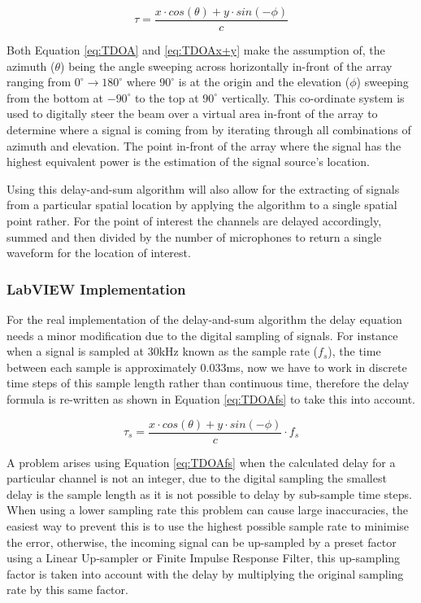 \documentclass{UoNMCHA}
\numberwithin{equation}{section}
\begin{document}
    \begin{equation}
        \tau = \frac{x \cdot cos(\theta) + y \cdot sin(-\phi)}{c}
        \label{eq:TDOAx+y}
    \end{equation}
    
    Both Equation \ref{eq:TDOA} and \ref{eq:TDOAx+y} make the assumption of, the azimuth ($\theta$) being the angle sweeping across horizontally in-front of the array ranging from $0^{\circ} \to 180^{\circ}$ where $90^{\circ}$ is at the origin and the elevation ($\phi$) sweeping from the bottom at $-90^{\circ}$ to the top at $90^{\circ}$ vertically. This co-ordinate system is used to digitally steer the beam over a virtual area in-front of the array to determine where a signal is coming from by iterating through all combinations of azimuth and elevation. The point in-front of the array where the signal has the highest equivalent power is the estimation of the signal source's location.
    
    Using this delay-and-sum algorithm will also allow for the extracting of signals from a particular spatial location by applying the algorithm to a single spatial point rather. For the point of interest the channels are delayed accordingly, summed and then divided by the number of microphones to return a single waveform for the location of interest.
\subsubsection{LabVIEW Implementation} \label{sec:DAS Implementation}
    For the real implementation of the delay-and-sum algorithm the delay equation needs a minor modification due to the digital sampling of signals. For instance when a signal is sampled at $30$kHz known as the sample rate ($f_s$), the time between each sample is approximately $0.033$ms, now we have to work in discrete time steps of this sample length rather than continuous time, therefore the delay formula is re-written as shown in Equation \ref{eq:TDOAfs} to take this into account.
    
    \begin{equation}
        \tau_s = \frac{x \cdot cos(\theta) + y \cdot sin(-\phi)}{c}\cdot f_s
        \label{eq:TDOAfs}
    \end{equation}
    
    A problem arises using Equation \ref{eq:TDOAfs} when the calculated delay for a particular channel is not an integer, due to the digital sampling the smallest delay is the sample length as it is not possible to delay by sub-sample time steps. When using a lower sampling rate this problem can cause large inaccuracies, the easiest way to prevent this is to use the highest possible sample rate to minimise the error, otherwise, the incoming signal can be up-sampled by a preset factor using a Linear Up-sampler or Finite Impulse Response Filter, this up-sampling factor is taken into account with the delay by multiplying the original sampling rate by this same factor. 
    
\end{document}
